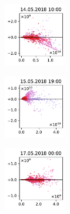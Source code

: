 \begin{figure}[H]
    \centering
    \begin{subfigure}
        \centering
        \includegraphics[width=0.30\textwidth,valign=t]{evaluation/figures/perturbations/perturbation-14.05.2018:10.00-monoterpenes-mul-1.01.pdf}
    \end{subfigure}
    \begin{subfigure}
        \centering
        \includegraphics[width=0.30\textwidth,valign=t]{evaluation/figures/perturbations/perturbation-15.05.2018:19.00-monoterpenes-mul-1.01.pdf}
    \end{subfigure}
    \begin{subfigure}
        \centering
        \includegraphics[width=0.30\textwidth,valign=t]{evaluation/figures/perturbations/perturbation-17.05.2018:00.00-monoterpenes-mul-1.01.pdf}
    \end{subfigure}


\end{figure}
